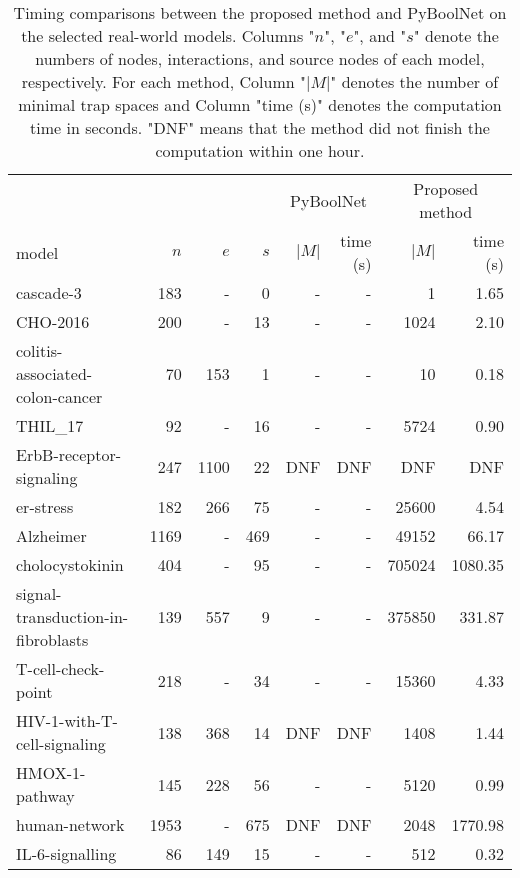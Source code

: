 \documentclass[runningheads]{llncs}
\begin{document}
\begin{table}[!ht]
  \caption{Timing comparisons between the proposed method and PyBoolNet on the selected real-world models.
    Columns "\(n\)", "\(e\)", and "\(s\)" denote the numbers of nodes, interactions, and source nodes of each model, respectively. For each method, Column "\(|M|\)" denotes the number of minimal trap spaces and Column "time (s)" denotes the computation time in seconds.
    "DNF" means that the method did not finish the computation within one hour.}
  \centering
  \label{tab:result_real}
  \begin{tabular}{lrrrrrrr}
    \toprule
    & & & & \multicolumn{2}{c}{PyBoolNet} & \multicolumn{2}{c}{Proposed method}\\
    \cmidrule(lr){5-6}\cmidrule(lr){7-8}
    model & $n$ & $e$ & $s$ & $|M|$ & time (s) & $|M|$ & time (s) \\ \midrule
    cascade-3~\cite{Tsirvouli2020} & 183 & - & 0 & - & - & 1 & 1.65 \\
    CHO-2016 & 200 & - & 13 & - & - & 1024 & 2.10 \\
    colitis-associated-colon-cancer~\cite{DBLP:journals/bmcsb/HelikarKMBRMWSLR12} & 70 & 153 & 1 & - & - & 10 & 0.18 \\
    THIL\_17 & 92 & - & 16 & - & - & 5724 & 0.90 \\
    ErbB-receptor-signaling~\cite{helikar2013comprehensive} & 247 & 1100 & 22 & DNF & DNF & DNF & DNF \\
    er-stress & 182 & 266 & 75 & - & - & 25600 & 4.54 \\
    Alzheimer~\cite{aghamiri2020automated} & 1169 & - & 469 & - & - & 49152 & 66.17 \\
    cholocystokinin~\cite{aghamiri2020automated} & 404 & - & 95 & - & - & 705024 & 1080.35 \\
    signal-transduction-in-fibroblasts~\cite{helikar2008emergent} & 139 & 557 & 9 & - & - & 375850 & 331.87 \\
    T-cell-check-point & 218 & - & 34 & - & - & 15360 & 4.33 \\
    HIV-1-with-T-cell-signaling~\cite{DBLP:journals/bmcsb/HelikarKMBRMWSLR12} & 138 & 368 & 14 & DNF & DNF & 1408 & 1.44 \\
    HMOX-1-pathway~\cite{ostaszewski2021covid19} & 145 & 228 & 56 & - & - & 5120 & 0.99 \\
    human-network & 1953 & - & 675 & DNF & DNF & 2048 & 1770.98 \\
    IL-6-signalling~\cite{DBLP:journals/bmcsb/HelikarKMBRMWSLR12} & 86 & 149 & 15 & - & - & 512 & 0.32 \\

\end{tabular}
\end{table}
\end{document}
